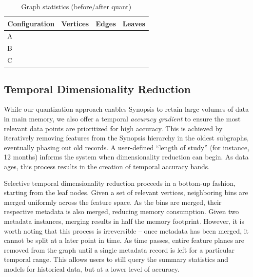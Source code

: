 \begin{table}[h!]
    \renewcommand{\arraystretch}{1.3}
    \caption{Graph statistics (before/after quant)}
    \label{tbl:graph-stats}
    \begin{center}
        \begin{tabular}{|l|c|c|c|}
            \hline
            Configuration & Vertices & Edges & Leaves \\
            \hline
            A & & & \\
            \hline
            B & & & \\
            \hline
            C & & & \\
            \hline
        \end{tabular}
    \end{center}
\end{table}

\subsection{Temporal Dimensionality Reduction}
While our quantization approach enables Synopsis to retain large volumes of data in main memory, we also offer a temporal \emph{accuracy gradient} to ensure the most relevant data points are prioritized for high accuracy. This is achieved by iteratively removing features from the Synopsis hierarchy in the oldest subgraphs, eventually phasing out old records. A user-defined ``length of study'' (for instance, 12 months) informs the system when dimensionality reduction can begin. As data ages, this process results in the creation of temporal accuracy bands.

Selective temporal dimensionality reduction proceeds in a bottom-up fashion, starting from the leaf nodes. Given a set of relevant vertices, neighboring bins are merged uniformly across the feature space. As the bins are merged, their respective metadata is also merged, reducing memory consumption. Given two metadata instances, merging results in half the memory footprint. However, it is worth noting that this process is irreversible -- once metadata has been merged, it cannot be split at a later point in time. As time passes, entire feature planes are removed from the graph until a single metadata record is left for a particular temporal range. This allows users to still query the summary statistics and models for historical data, but at a lower level of accuracy.

